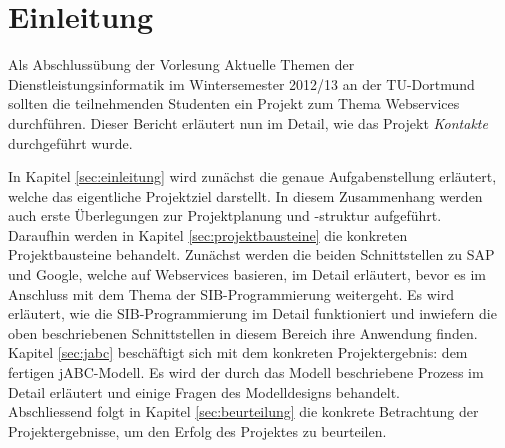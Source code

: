 \section{Einleitung}
Als Abschlussübung der Vorlesung Aktuelle Themen der Dienstleistungsinformatik im Wintersemester
 2012/13 an der TU-Dortmund sollten die teilnehmenden Studenten ein Projekt zum Thema Webservices
 durchführen. Dieser Bericht erläutert nun im Detail, wie das Projekt \textit{Kontakte} durchgeführt wurde.

In Kapitel \ref{sec:einleitung} wird zunächst die genaue Aufgabenstellung erläutert, welche das eigentliche Projektziel darstellt. In diesem Zusammenhang werden auch erste Überlegungen zur Projektplanung und -struktur aufgeführt.\\

Daraufhin werden in Kapitel \ref{sec:projektbausteine} die konkreten Projektbausteine behandelt. Zunächst werden die beiden Schnittstellen zu SAP und Google, welche auf Webservices basieren, im Detail erläutert, bevor es im Anschluss mit dem Thema der SIB-Programmierung weitergeht. Es wird erläutert, wie die SIB-Programmierung im Detail funktioniert und inwiefern die oben beschriebenen Schnittstellen in diesem Bereich ihre Anwendung finden.\\

Kapitel \ref{sec:jabc} beschäftigt sich mit dem konkreten Projektergebnis: dem fertigen jABC-Modell. Es wird der durch das Modell beschriebene Prozess im Detail erläutert und einige Fragen des Modelldesigns behandelt.\\

Abschliessend folgt in Kapitel \ref{sec:beurteilung} die konkrete Betrachtung der Projektergebnisse, um den Erfolg des Projektes zu beurteilen. 


